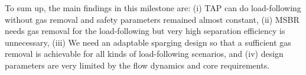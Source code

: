     To sum up, the main findings in this milestone are: (i) TAP can do 
    load-following without gas removal and safety parameters remained almost 
    constant, (ii) \gls{MSBR} needs gas removal for the load-following but very high 
    separation efficiency is unnecessary, (iii) We need an adaptable sparging 
    design so that a sufficient gas removal is achievable for all kinds of 
    load-following scenarios, and (iv) design parameters are very limited by the 
    flow dynamics and core requirements.

